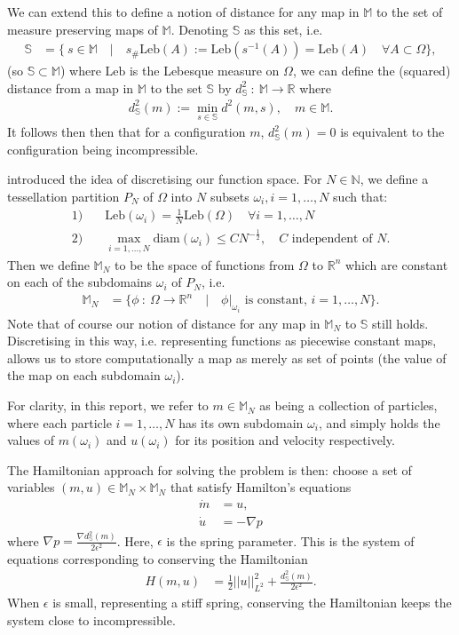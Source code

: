 \documentclass[11pt, oneside]{article}   	%
\newcommand{\R}{\mathbb{R}}
\newcommand{\MN}{\mathbb{M}_N}
\newcommand{\dsmsq}{d^{2}_{\mathbb{S}}(m)}
\newcommand{\graddsmsq}{\nabla{d^{2}_{\mathbb{S}}(m)}}
\newcommand{\M}{\mathbb{M}}
\newcommand{\N}{\mathbb{N}}
\newcommand{\Sb}{\mathbb{S}}
\newcommand{\Leb}{\mathrm{Leb}}
\begin{document}
We can extend this to define a notion of distance for any map in \(\M\) to the set of measure preserving maps of \(\M\). Denoting \(\Sb\) as this set, i.e. 
\begin{align}
\Sb &= \Big\{ \: s \in \M \quad | \quad s_{\#}\Leb(A) := \Leb(s^{-1}(A)) = \Leb(A) \quad \forall A \subset \Omega \Big\},
\end{align}
(so \(\Sb \subset \M\)) where \(\Leb\) is the Lebesque measure on \(\Omega\), we can define the (squared) distance from a map in \(\M\) to the set \(\Sb\) by \(d^2_\Sb \: : \: \M \to \R\) where
\begin{align}
\dsmsq := \min_{s \in \mathbb{S}} d^2(m, s), \quad m \in \M.
\end{align}
It follows then then that for a configuration \(m\), \(\dsmsq = 0\) is equivalent to the configuration being incompressible.

\cite{gallouet2016lagrangian} introduced the idea of discretising our function space. For \(N \in \N\), we define a tessellation partition \(P_N\) of \(\Omega\) into \(N\) subsets \(\omega_i, i=1,\dots,N\) such that:
\begin{align}
1)& \quad \Leb(\omega_i) = \frac{1}{N}\Leb(\Omega) \quad \forall i = 1,\dots,N \\
2)& \quad \max_{i = 1,\dots,N} \mathrm{diam}(\omega_i) \le CN^{-\frac{1}{2}}, \quad C \text{ independent of } N.
\end{align}
Then we define \(\MN\) to be the space of functions from \(\Omega\) to \(\R^n\) which are constant on each of the subdomains \(\omega_i\) of \(P_N\), i.e.
\begin{align}
\MN &= \Big\{ \phi \: : \: \Omega \to \R^n \quad | \quad \phi | _{\omega_i} \text{ is constant, } i = 1,\dots,N \Big\}.
\end{align}
Note that of course our notion of distance for any map in \(\MN\) to \(\Sb\) still holds. Discretising in this way, i.e. representing functions as piecewise constant maps, allows us to store computationally a map as merely as set of points (the value of the map on each subdomain \(\omega_i\)).

For clarity, in this report, we refer to \(m \in \MN\)  as being a collection of particles, where each particle \(i=1,\dots,N\) has its own subdomain \(\omega_i\), and simply holds the values of \(m(\omega_i)\) and \(u(\omega_i)\) for its position and velocity respectively.

The Hamiltonian approach for solving the problem is then: choose a set of variables \((m, u) \in \MN \times \MN \) that satisfy Hamilton's equations
\begin{align} 
\dot{m} &= u, \\
\dot{u} &= - \nabla p
\end{align}
where \(\nabla p = \frac{\graddsmsq}{2\epsilon^2}\). Here, \(\epsilon\) is the spring parameter. This is the system of equations corresponding to conserving the Hamiltonian
\begin{align} 
H(m, u) &= \frac{1}{2} ||u||^2_{L^2} + \frac{\dsmsq}{2\epsilon^2}.
\end{align}
When \(\epsilon\) is small, representing a stiff spring, conserving the Hamiltonian keeps the system close to incompressible.
\end{document}
